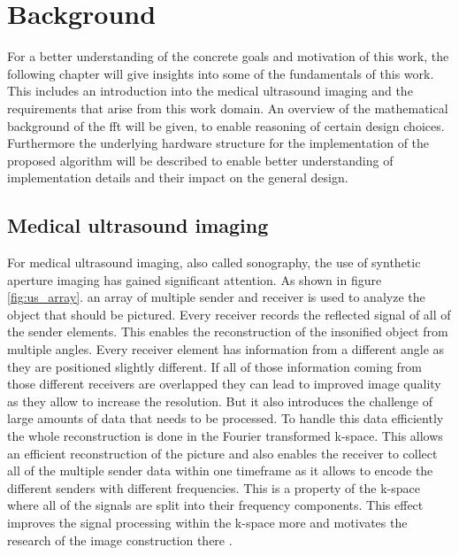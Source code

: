 \chapter{Background}\label{ch:background}

For a better understanding of the concrete goals and motivation of this work, the following chapter will give insights into some of the fundamentals of this work. This includes an introduction into the medical ultrasound imaging and the requirements that arise from this work domain. An overview of the mathematical background of the \ac{fft} will be given, to enable reasoning of certain design choices. Furthermore the underlying hardware structure for the implementation of the proposed algorithm will be described to enable better understanding of implementation details and their impact on the general design. 

\section{Medical ultrasound imaging} \label{sec:fbi}
For medical ultrasound imaging, also called sonography, the use of synthetic aperture imaging has gained significant attention. As shown in figure \ref{fig:us_array}. an array of multiple sender and receiver is used to analyze the object that should be pictured. Every receiver records the reflected signal of all of the sender elements. This enables the reconstruction of the insonified object from multiple angles. Every receiver element has information from a different angle as they are positioned slightly different. If all of those information coming from those different receivers are overlapped they can lead to improved image quality as they allow to increase the resolution.  But it also introduces the challenge of large amounts of data that needs to be processed. To handle this data efficiently the whole reconstruction is done in the Fourier transformed k-space. This allows an efficient reconstruction of the picture and also enables the receiver to collect all of the multiple sender data within one timeframe as it allows to encode the different senders with different frequencies. This is a property of the k-space where all of the signals are split into their frequency components. This effect improves the signal processing within the k-space more and motivates the research of the image construction there \cite{Dorausch_2022}.\par

